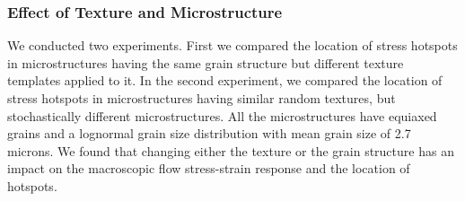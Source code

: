 \documentclass[preprint,1p,times,authoryear]{elsarticle}%
\begin{document}

\subsubsection{Effect of Texture and Microstructure}\label{Effect of Texture}
We conducted two experiments. First we compared the location of stress hotspots in microstructures having the same grain structure but different texture templates applied to it. In the second experiment, we compared the location of stress hotspots in microstructures having similar random textures, but stochastically different microstructures. All the microstructures have equiaxed grains and a lognormal grain size distribution with mean grain size of 2.7 microns. We found that changing either the texture or the grain structure has an impact on the macroscopic flow stress-strain response and the location of hotspots.
\end{document}
